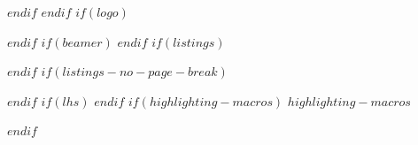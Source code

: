 $endif$
$endif$
$if(logo)$
\usepackage[export]{adjustbox}
\usepackage{graphicx}
$endif$
$if(beamer)$
\newif\ifbibliography
$endif$
$if(listings)$
\usepackage{listings}
\newcommand{\passthrough}[1]{#1}
$endif$
$if(listings-no-page-break)$
\usepackage{etoolbox}
$endif$
$if(lhs)$
$endif$
$if(highlighting-macros)$
$highlighting-macros$

%
\usepackage{fvextra}

$endif$


\usepackage{longtable,booktabs,array}
\usepackage{caption} %

\usepackage{multirow, makecell}
\usepackage{calc} %
\usepackage{etoolbox}
\makeatletter
\patchcmd\longtable{\par}{\if@noskipsec\mbox{}\fi\par}{}{}
\makeatother

